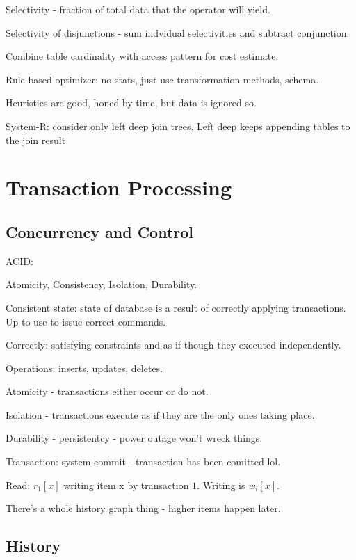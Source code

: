 \documentclass{article}
\begin{document}
			Selectivity - fraction of total data that the operator will yield.
			
			Selectivity of disjunctions - sum indvidual selectivities and subtract conjunction.
		
			Combine table cardinality with access pattern for cost estimate.
			
			Rule-based optimizer: no stats, just use transformation methods, schema.
			
			Heuristics are good, honed by time, but data is ignored so.
			
			System-R: consider only left deep join trees. Left deep keeps appending tables to the join result
			
\section{Transaction Processing}

	

	\subsection{Concurrency and Control}
	
		ACID:
		
		Atomicity, Consistency, Isolation, Durability.
		
		Consistent state: state of database is a result of correctly applying transactions. Up to use to issue correct commands.
		
		Correctly: satisfying constraints and as if though they executed independently.
		
		Operations: inserts, updates, deletes.
		
		Atomicity - transactions either occur or do not.
			
		Isolation - transactions execute as if they are the only ones taking place.
			
		Durability - persistentcy - power outage won't wreck things.
		
		Transaction: system commit - transaction has been comitted lol.
		
		Read: $r_1[x]$ writing item x by transaction $1$. Writing is $w_i[x]$.
		
		There's a whole history graph thing - higher items happen later.
		
	\subsection{History}
	
\end{document}

